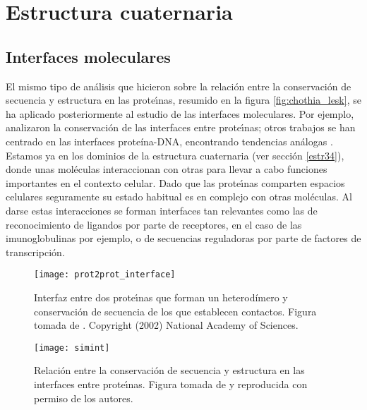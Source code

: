 \chapter{Estructura cuaternaria} \label{s4}

\section{Interfaces moleculares}

El mismo tipo de an\'{a}lisis que hicieron \citet{Chothia1986} sobre la relaci\'{o}n entre la conservaci\'{o}n de secuencia
y estructura en las prote\'\i{}nas, resumido en la figura \ref{fig:chothia_lesk}, se ha aplicado posteriormente al estudio de 
las interfaces moleculares. Por ejemplo, \cite{Aloy2002a} %
analizaron la conservaci\'{o}n de las interfaces entre prote\'\i{}nas; otros trabajos se han centrado en las interfaces prote\'{i}na-DNA, 
encontrando tendencias an\'{a}logas \citep{ContrerasMoreira2006}.
Estamos ya en los dominios de la estructura cuaternaria (ver secci\'{o}n \ref{estr34}),
donde unas mol\'{e}culas interaccionan con otras para llevar a cabo funciones importantes en el contexto celular. 
Dado que las prote\'\i{}nas comparten espacios celulares seguramente su estado habitual es en complejo con otras mol\'{e}culas.
Al darse estas interacciones se forman interfaces tan relevantes como las de reconocimiento de ligandos por parte de receptores,
en el caso de las imunoglobulinas por ejemplo, o de secuencias reguladoras por parte de factores de transcripci\'{o}n.

\begin{figure}
\begin{center} 
\texttt{[image: prot2prot\_interface]}
\caption%
{
Interfaz entre dos prote\'\i{}nas que forman un heterod\'{i}mero y conservaci\'{o}n de secuencia de los que establecen contactos. 
Figura tomada de \citet{Aloy2002a}. Copyright (2002) National Academy of Sciences.
}
\label{fig:prot2protI}
\end{center}
\end{figure}

\begin{figure}
\begin{center} 
\texttt{[image: simint]}
\caption%
{
Relaci\'{o}n entre la conservaci\'{o}n de secuencia y estructura en las interfaces entre prote\'\i{}nas.
Figura tomada de \citet{Aloy2003} y reproducida con permiso de los autores.
}
\label{fig:prot2prot_cons}
\end{center}
\end{figure}

